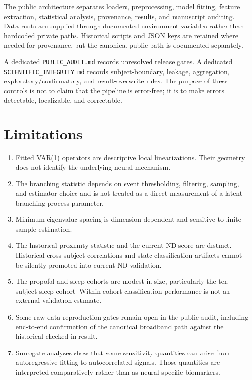 \documentclass[preprint,12pt,nonatbib]{elsarticle}
\begin{document}
The public architecture separates loaders, preprocessing, model fitting, feature extraction, statistical analysis, provenance, results, and manuscript auditing. Data roots are supplied through documented environment variables rather than hardcoded private paths. Historical scripts and JSON keys are retained where needed for provenance, but the canonical public path is documented separately.

A dedicated \texttt{PUBLIC\_AUDIT.md} records unresolved release gates. A dedicated \texttt{SCIENTIFIC\_INTEGRITY.md} records subject-boundary, leakage, aggregation, exploratory/confirmatory, and result-overwrite rules. The purpose of these controls is not to claim that the pipeline is error-free; it is to make errors detectable, localizable, and correctable.

\section{Limitations}
\begin{enumerate}
\item Fitted VAR(1) operators are descriptive local linearizations. Their geometry does not identify the underlying neural mechanism.
\item The branching statistic depends on event thresholding, filtering, sampling, and estimator choice and is not treated as a direct measurement of a latent branching-process parameter.
\item Minimum eigenvalue spacing is dimension-dependent and sensitive to finite-sample estimation.
\item The historical proximity statistic and the current ND score are distinct. Historical cross-subject correlations and state-classification artifacts cannot be silently promoted into current-ND validation.
\item The propofol and sleep cohorts are modest in size, particularly the ten-subject sleep cohort. Within-cohort classification performance is not an external validation estimate.
\item Some raw-data reproduction gates remain open in the public audit, including end-to-end confirmation of the canonical broadband path against the historical checked-in result.
\item Surrogate analyses show that some sensitivity quantities can arise from autoregressive fitting to autocorrelated signals. Those quantities are interpreted comparatively rather than as neural-specific biomarkers.
\end{enumerate}
\end{document}
